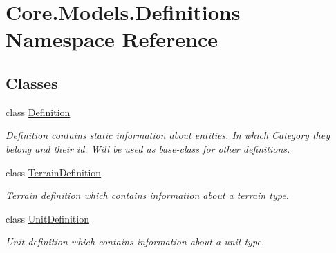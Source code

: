 \hypertarget{namespaceCore_1_1Models_1_1Definitions}{}\section{Core.\+Models.\+Definitions Namespace Reference}
\label{namespaceCore_1_1Models_1_1Definitions}
\subsection*{Classes}
\begin{DoxyCompactItemize}
\item 
class \hyperlink{classCore_1_1Models_1_1Definitions_1_1Definition}{Definition}
\begin{DoxyCompactList}\small\item\em \hyperlink{classCore_1_1Models_1_1Definitions_1_1Definition}{Definition} contains static information about entities. In which Category they belong and their id. Will be used as base-\/class for other definitions. \end{DoxyCompactList}\item 
class \hyperlink{classCore_1_1Models_1_1Definitions_1_1TerrainDefinition}{Terrain\+Definition}
\begin{DoxyCompactList}\small\item\em Terrain definition which contains information about a terrain type. \end{DoxyCompactList}\item 
class \hyperlink{classCore_1_1Models_1_1Definitions_1_1UnitDefinition}{Unit\+Definition}
\begin{DoxyCompactList}\small\item\em Unit definition which contains information about a unit type. \end{DoxyCompactList}\end{DoxyCompactItemize}
